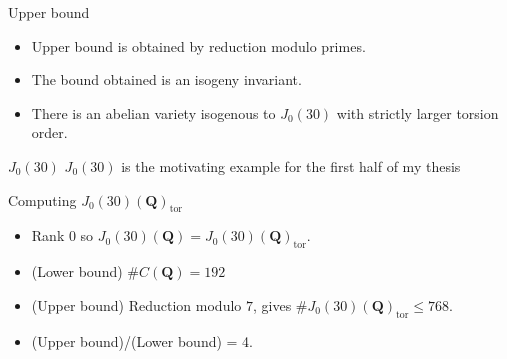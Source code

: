 \documentclass{beamer}
\newcommand{\QQ}{\mathbf{Q}}
\newcommand{\FF}{\mathbf{F}}
\newcommand{\tor}{\mathrm{tor}}
\newcommand{\Frob}{\mathrm{Frob}}
\newcommand{\p}{\mathfrak{p}}
\begin{document}
\begin{frame}{Upper bound}
    \begin{itemize}
        \item
            Upper bound is obtained by reduction modulo primes.
        \item
            The bound obtained is an isogeny invariant.
        \item
            There is an abelian variety isogenous to $J_0(30)$ with strictly
            larger torsion order.
    \end{itemize}
\end{frame}


\begin{frame}{$J_0(30)$}
    \Large{$J_0(30)$ is the motivating example for the first half of my thesis}
\end{frame}

\begin{frame}{Computing $J_0(30)(\QQ)_\tor$}
    \begin{itemize}
        \item
            Rank 0 so $J_0(30)(\QQ)=J_0(30)(\QQ)_\tor$.
        \item
            (Lower bound) $\#C(\QQ)=192$
        \item
            (Upper bound) Reduction modulo $7$, gives $\# J_0(30)(\QQ)_\tor\leq
            768$.
        \item
            (Upper bound)/(Lower bound) = 4.
    \end{itemize}
\end{frame}
\end{document}
